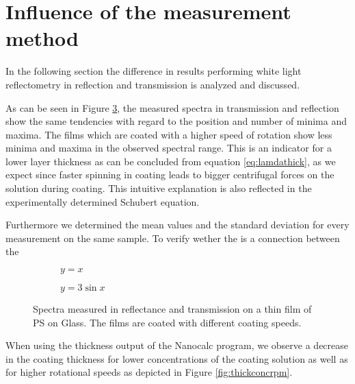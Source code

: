 \section{Influence of the measurement method}
\label{sec:Method}

In the following section the difference in results performing white light reflectometry in reflection
and transmission is analyzed and discussed.

As can be seen in Figure \ref{fig:SpecRefTrans}, the measured spectra in transmission and reflection show the same tendencies with regard to the position and number of minima and maxima. The films which are coated with a higher speed of rotation show less minima and maxima in the 
observed spectral range. This is an indicator for a lower layer thickness as can be concluded from equation \ref{eq:lamdathick}, as we expect since faster spinning in coating leads to 
bigger centrifugal forces on the solution during coating. This intuitive explanation is also reflected in the experimentally determined Schubert equation. 

Furthermore we determined the mean values and the standard deviation for every measurement on the same sample. To verify wether the is a 
connection between the 


\begin{figure}[h]
    \centering
    \begin{subfigure}[b]{0.70\textwidth}
        \centering
        
        \caption{$y=x$}
        \label{fig:y equals x}
    \end{subfigure}  
    

    \begin{subfigure}[b]{0.70\textwidth}
        \centering
           
        \caption{$y=3\sin x$} 
        \label{fig:three sin x}
    \end{subfigure}

    \caption{Spectra measured in reflectance and transmission on a thin film of PS on Glass. The films are coated with different coating speeds.}
    \label{fig:SpecRefTrans}
\end{figure}

When using the thickness output of the Nanocalc program, we observe a decrease in the coating thickness for lower concentrations of the coating solution as well as for higher rotational speeds as depicted in Figure \ref{fig:thickconcrpm}.

